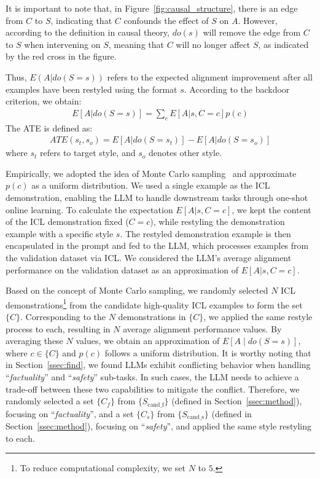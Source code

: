 It is important to note that, in Figure~\ref{fig:causal_structure}, there is an edge from $C$ to $S$, indicating that $C$ confounds the effect of $S$ on $A$. 
However, according to the definition in causal theory, $do(s)$ will remove the edge from $C$ to $S$ when intervening on $S$, meaning that $C$ will no longer affect $S$, as indicated by the red cross in the figure.

Thus, $E(A|do(S=s))$ refers to the expected alignment improvement after all examples have been restyled using the format $s$. According to the backdoor criterion, we obtain:
\begin{align}
E[A | do(S = s)] = \sum_{c} E[A | s, C = c] p(c)
\end{align}
The ATE is defined as:
\begin{align}
ATE(s_t, s_o) = E[A | do(S = s_t)] - E[A | do(S = s_o)]
\label{equ:ATE}
\end{align}
where $s_t$ refers to target style, and $s_o$ denotes other style.

Empirically, we adopted the idea of Monte Carlo sampling~\citep{knaus2021machine} and approximate $p(c)$ as a uniform distribution.
We used a single example as the ICL demonstration, enabling the LLM to handle downstream tasks through one-shot online learning. 
To calculate the expectation $E[A | s, C = c]$, we kept the content of the ICL demonstration fixed ($C=c$), while restyling the demonstration example with a specific style $s$.
The restyled demonstration example is then encapsulated in the prompt and fed to the LLM, which processes examples from the validation dataset via ICL. 
We considered the LLM’s average alignment performance on the validation dataset as an approximation of $E[A | s, C = c]$. %


Based on the concept of Monte Carlo sampling, we randomly selected $N$ ICL demonstrations\footnote{To reduce computational complexity, we set $N$ to $5$.} from the candidate high-quality ICL examples to form the set $\{C\}$. 
Corresponding to the $N$ demonstrations in $\{C\}$, we applied the same restyle process to each, resulting in $N$ average alignment performance values. 
By averaging these $N$ values, we obtain an approximation of $E[A \mid do(S = s)]$, where $c \in \{C\}$ and $p(c)$ follows a uniform distribution.
It is worthy noting that in Section~\ref{ssec:find}, we found LLMs exhibit conflicting behavior when handling ``\textit{factuality}'' and ``\textit{safety}'' sub-tasks.
In such cases, the LLM needs to achieve a trade-off between these two capabilities to mitigate the conflict. 
Therefore, we randomly selected a set $\{C_f\}$ from $\{S_\text{cand\_f}\}$ (defined in Section~\ref{ssec:method}), focusing on ``\textit{factuality}'', and a set $\{C_s\}$ from $\{S_\text{cand\_s}\}$ (defined in Section~\ref{ssec:method}), focusing on ``\textit{safety}'', and applied the same style restyling to each.

